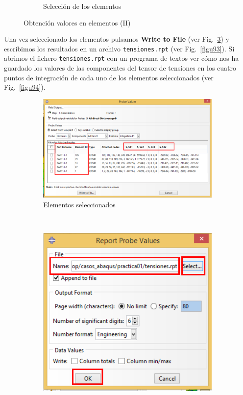 \begin{enumerate}
\begin{figure}[H]
\begin{subfigure}{0.49\textwidth}
     \caption{Selección de los elementos}
     \label{figu91}
   \end{subfigure}%
   \caption{Obtención valores en elementos (II)}
 \end{figure}

 Una vez seleccionado los elementos pulsamos \textbf{Write to File}
 (ver Fig.~\ref{figu92}) y escribimos los resultados en un archivo
 \texttt{tensiones.rpt} (ver Fig.~\ref{figu93}). Si abrimos el fichero
 \texttt{tensiones.rpt} con un programa de textos ver cómo nos ha
 guardado los valores de las componentes del tensor de tensiones en
 los cuatro puntos de integración de cada uno de los elementos
 seleccionados (ver Fig.~\ref{figu94}).

 \begin{figure}[H]
   \centering
   \begin{subfigure}{0.32\textwidth}
     \includegraphics[width=\textwidth]{./body/images/imagen92.pdf}
     \caption{Elementos seleccionados}
     \label{figu92}
   \end{subfigure}%
   ~ %
   \begin{subfigure}{0.32\textwidth}
     \includegraphics[width=\textwidth]{./body/images/imagen93.pdf}

\end{subfigure}
\end{figure}
\end{enumerate}
